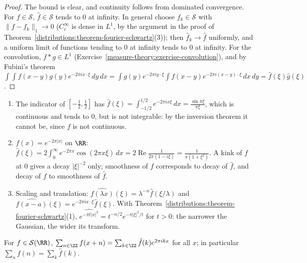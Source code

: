 \begin{proof}
The bound is clear, and continuity follows from dominated convergence. For $f \in \mathcal{S}$, $\hat f \in \mathcal{S}$ tends to $0$ at infinity. In general choose $f_k \in \mathcal{S}$ with $\|f - f_k\|_1 \to 0$
($C_c^\infty$ is dense in $L^1$, by the argument in the proof of Theorem~\ref{distributions:theorem-fourier-schwartz}(3)); then $\hat f_k \to \hat f$ uniformly, and a uniform limit of functions tending to
$0$ at infinity tends to $0$ at infinity. For the convolution, $f * g \in L^1$ (Exercise~\ref{measure-theory:exercise-convolution}), and by Fubini's theorem
$\int\int f(x - y)g(y)e^{-2\pi ix\cdot\xi}\,dy\,dx = \int g(y)e^{-2\pi iy\cdot\xi}\int f(x - y)e^{-2\pi i(x - y)\cdot\xi}\,dx\,dy = \hat f(\xi)\hat g(\xi)$.
\end{proof}

\begin{example}\label{distributions:example-fourier-computations}
\begin{enumerate}
\item The indicator of $[-\frac12, \frac12]$ has $\hat f(\xi) = \int_{-1/2}^{1/2}e^{-2\pi ix\xi}\,dx = \frac{\sin\pi\xi}{\pi\xi}$, which is continuous and tends to $0$, but is not integrable: by the inversion theorem it
cannot be, since $f$ is not continuous.
\item $f(x) = e^{-2\pi|x|}$ on $\RR$: $\hat f(\xi) = 2\int_0^\infty e^{-2\pi x}\cos(2\pi x\xi)\,dx = 2\operatorname{Re}\frac{1}{2\pi(1 - i\xi)} = \frac{1}{\pi(1 + \xi^2)}$. A kink of $f$ at $0$ gives a decay
$|\xi|^{-2}$ only; smoothness of $f$ corresponds to decay of $\hat f$, and decay of $f$ to smoothness of $\hat f$.
\item Scaling and translation: $\widehat{f(\lambda x)}(\xi) = \lambda^{-n}\hat f(\xi/\lambda)$ and $\widehat{f(x - a)}(\xi) = e^{-2\pi ia\cdot\xi}\hat f(\xi)$. With
Theorem~\ref{distributions:theorem-fourier-schwartz}(1), $\widehat{e^{-\pi t|x|^2}} = t^{-n/2}e^{-\pi|\xi|^2/t}$ for $t > 0$: the narrower the Gaussian, the wider its transform.
\end{enumerate}
\end{example}

\begin{proposition}\label{distributions:proposition-poisson}
For $f \in \mathcal{S}(\RR)$, $\sum_{n \in \ZZ}f(x + n) = \sum_{k \in \ZZ}\hat f(k)e^{2\pi ikx}$ for all $x$; in particular $\sum_nf(n) = \sum_k\hat f(k)$.
\end{proposition}

